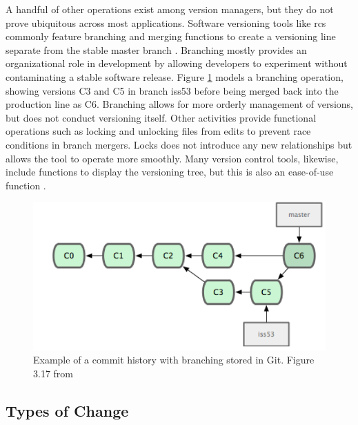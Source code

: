 A handful of other operations exist among version managers, but they do not prove ubiquitous across most applications.
Software versioning tools like \gls{rcs} commonly feature branching and merging functions to create a versioning line separate from the stable master branch \cite{tichy1985rcs}.
Branching mostly provides an organizational role in development by allowing developers to experiment without contaminating a stable software release.
Figure \ref{GITTree} models a branching operation, showing versions C3 and C5 in branch iss53 before being merged back into the production line as C6.
Branching allows for more orderly management of versions, but does not conduct versioning itself.
Other activities provide functional operations such as locking and unlocking files from edits to prevent race conditions in branch mergers.
Locks does not introduce any new relationships but allows the tool to operate more smoothly.
Many version control tools, likewise, include functions to display the versioning tree, but this is also an ease-of-use function \cite{Dijkstra1994}.

\begin{figure}
	\centering
	\includegraphics[scale=0.75]{figures/GITCommitTree.png}
	\caption[Example of a commit history with branching stored in Git.]{Example of a commit history with branching stored in Git.  Figure 3.17 from \cite{Chacon:2009:PG:1618548}}
	\label{GITTree}
\end{figure}

\subsection{Types of Change}

